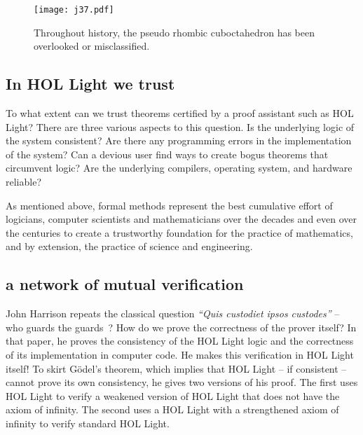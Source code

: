 \documentclass{llncs}
\begin{document}
\begin{figure}[h!]
  \centering
\texttt{[image: j37.pdf]}
  \caption{Throughout history, the pseudo rhombic cuboctahedron has been overlooked or
misclassified.}
\label{fig:pseudo}
\end{figure}

















\subsection{In HOL Light we trust}

To what extent can we trust theorems certified by a proof assistant
such as HOL Light?  There are three various aspects to this question.
Is the underlying logic of the system consistent?  Are there any
programming errors in the implementation of the system?  Can a devious
user find ways to create bogus theorems that circumvent logic?  Are
the underlying compilers, operating system, and hardware reliable?

As mentioned above, formal methods represent the best cumulative effort of
logicians, computer scientists and mathematicians over the decades and
even over the centuries to create a trustworthy foundation for the
practice of mathematics, and by extension, the practice of science and
engineering.  

\subsection{a network of mutual verification}

John Harrison
repeats the classical question
{\it ``Quis custodiet ipsos custodes''} -- who guards the
guards~\cite{HaSelf}?  How do we prove the correctness of the prover
itself?  In that paper, he proves the consistency of the HOL Light
logic and the correctness of its implementation in computer code.  He
makes this verification in HOL Light itself!  To skirt G\"odel's
theorem, which implies that HOL Light -- if consistent -- cannot prove
its own consistency, he gives two versions of his proof.  The first
uses HOL Light to verify a weakened version of HOL Light that does not
have the axiom of infinity.  The second uses a HOL Light with a
strengthened axiom of infinity to verify standard HOL Light.
\end{document}
